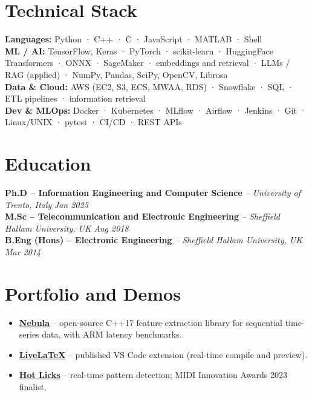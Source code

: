 \documentclass[11pt]{article}
\begin{document}
\section*{Technical Stack}

\textbf{Languages:} Python · C++ · C · JavaScript · MATLAB · Shell\\
\textbf{ML / AI:} TensorFlow, Keras · PyTorch · scikit-learn · HuggingFace Transformers · ONNX · SageMaker · embeddings and retrieval · LLMs / RAG (applied) · NumPy, Pandas, SciPy, OpenCV, Librosa\\
\textbf{Data \& Cloud:} AWS (EC2, S3, ECS, MWAA, RDS) · Snowflake · SQL · ETL pipelines · information retrieval\\
\textbf{Dev \& MLOps:} Docker · Kubernetes · MLflow · Airflow · Jenkins · Git · Linux/UNIX · pytest · CI/CD · REST APIs

\section*{Education}
\textbf{Ph.D -- Information Engineering and Computer Science} \textit{\small{ -- University of Trento, Italy}} \hfill \textit{Jan 2025}\\[2pt]
\noindent\textbf{M.Sc -- Telecommunication and Electronic Engineering} \textit{\small{ -- Sheffield Hallam University, UK}} \hfill \textit{Aug 2018}\\[2pt]
\noindent\textbf{B.Eng (Hons) -- Electronic Engineering} \textit{\small{ -- Sheffield Hallam University, UK}} \hfill \textit{Mar 2014}

\section*{Portfolio and Demos \footnotesize {}}
\begin{itemize}[leftmargin=1.2em, itemsep=-0.25em]
    \item \href{https://github.com/ns2max/nebula}{\textbf{Nebula}} -- open-source C++17 feature-extraction library for sequential time-series data, with ARM latency benchmarks.
    \item \href{https://marketplace.visualstudio.com/items?itemName=ns2max.livelatex}{\textbf{LiveLaTeX}} -- published VS Code extension (real-time compile and preview).
    \item \href{https://youtu.be/gkOqfOT8zXM}{\textbf{Hot Licks}} -- real-time pattern detection; MIDI Innovation Awards 2023 finalist.
\end{itemize}
\end{document}
